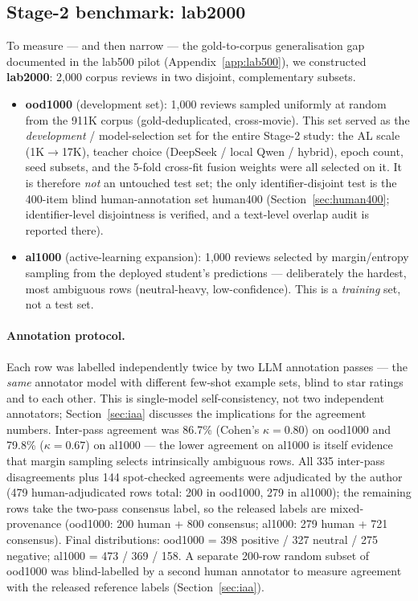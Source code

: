 \documentclass[11pt,a4paper]{article}
\begin{document}
\subsection{Stage-2 benchmark: lab2000}
\label{sec:lab2000-data}

To measure --- and then narrow --- the gold-to-corpus generalisation
gap documented in the lab500 pilot (Appendix~\ref{app:lab500}), we
constructed
\textbf{lab2000}: 2{,}000 corpus reviews in two disjoint, complementary
subsets.

\begin{itemize}
  \item \textbf{ood1000} (development set): 1{,}000 reviews sampled
        uniformly at random from the 911K corpus (gold-deduplicated,
        cross-movie). This set served as the \emph{development} /
        model-selection set for the entire Stage-2 study: the AL scale
        (1K$\to$17K), teacher choice (DeepSeek / local Qwen / hybrid),
        epoch count, seed subsets, and the 5-fold cross-fit fusion
        weights were all selected on it. It is therefore \emph{not} an
        untouched test set; the only identifier-disjoint test is the
        400-item blind human-annotation set human400
        (Section~\ref{sec:human400}; identifier-level disjointness is
        verified, and a text-level overlap audit is reported there).
  \item \textbf{al1000} (active-learning expansion): 1{,}000 reviews
        selected by margin/entropy sampling from the deployed student's
        predictions --- deliberately the hardest, most ambiguous rows
        (neutral-heavy, low-confidence). This is a \emph{training}
        set, not a test set.
\end{itemize}

\paragraph{Annotation protocol.} Each row was labelled independently
twice by two LLM annotation passes --- the \emph{same} annotator model
with different few-shot example sets, blind to star ratings and to
each other. This is single-model self-consistency, not two independent
annotators; Section~\ref{sec:iaa} discusses the implications for the
agreement numbers. Inter-pass agreement was 86.7\%
(Cohen's $\kappa = 0.80$) on ood1000 and 79.8\% ($\kappa = 0.67$) on
al1000 --- the lower agreement on al1000 is itself evidence that margin
sampling selects intrinsically ambiguous rows. All 335 inter-pass
disagreements plus 144 spot-checked agreements were adjudicated by the
author (479 human-adjudicated rows total: 200 in ood1000, 279 in
al1000); the remaining rows take the two-pass consensus label, so the
released labels are mixed-provenance (ood1000: 200 human + 800
consensus; al1000: 279 human + 721 consensus). Final distributions:
ood1000 = 398 positive / 327 neutral / 275 negative; al1000 = 473 /
369 / 158. A separate 200-row random subset of ood1000 was
blind-labelled by a second human annotator to measure agreement with
the released reference labels (Section~\ref{sec:iaa}).
\end{document}
